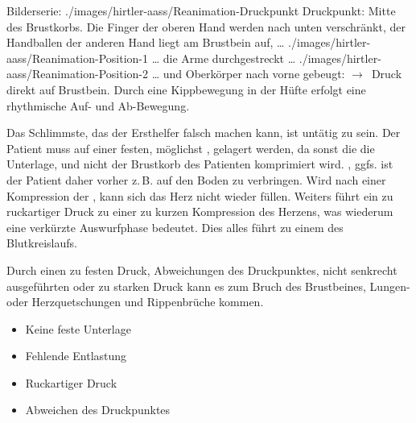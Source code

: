 \begin{PictureSeriesWide}{}{Bilderserie:  }
{./images/hirtler-aass/Reanimation-Druckpunkt}
{Druckpunkt: Mitte des Brustkorbs. %
Die Finger der oberen Hand werden nach unten verschränkt, 
der Handballen der anderen Hand liegt am Brustbein auf, \ldots}
{./images/hirtler-aass/Reanimation-Position-1}
{{\ldots} die Arme durchgestreckt \ldots}
{./images/hirtler-aass/Reanimation-Position-2}
{{\ldots} und Oberkörper nach vorne gebeugt: %
$\rightarrow$~Druck direkt auf Brustbein. %
Durch eine Kippbewegung in
der Hüfte erfolgt eine rhythmische Auf- und Ab-Bewegung. %
}
{}
{}
\end{PictureSeriesWide}

{%
Das Schlimmste, das der Ersthelfer falsch machen kann, ist
{untätig} zu sein.  
Der Patient muss auf einer festen, 
möglichst , 
 gelagert werden, 
da sonst die die Unterlage, 
und nicht der Brustkorb des Patienten komprimiert wird. 
, 
ggfs. ist der Patient daher vorher z.\,B. auf den Boden zu verbringen.
Wird nach einer Kompression der ,
kann sich das Herz nicht wieder füllen. 
Weiters führt ein zu ruckartiger Druck zu einer zu kurzen
Kompression des Herzens, 
was wiederum eine verkürzte
Auswurfphase bedeutet. 
Dies alles führt zu einem
 des Blutkreislaufs. 

Durch 
einen zu festen Druck,  
Abweichungen des Druckpunktes, 
nicht senkrecht ausgeführten 
oder zu starken Druck 
kann es zum Bruch des Brustbeines, 
Lungen- oder Herzquetschungen 
und Rippenbrüche kommen.

}{
\begin{itemize}
  \item Keine feste Unterlage
  \item Fehlende Entlastung
  \item Ruckartiger Druck
  \item Abweichen des Druckpunktes
\end{itemize}
}{}{}{}

\begin{Synopsis}
\end{Synopsis}

